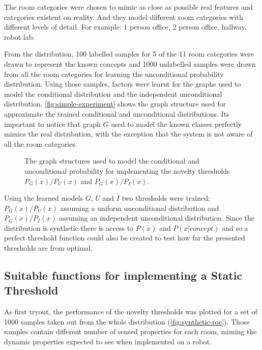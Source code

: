 \documentclass[runningheads,a4paper]{llncs}
\begin{document}
The room categories were chosen to mimic as close as possible real features and
categories existent on reality. And they model different room categories with
different levels of detail. For example: 1 person office, 2 person office, hallway,
robot lab.

From the distribution, 100 labelled samples for 5 of the 11 room categories were
drawn to represent the known concepts and 1000 unlabelled samples were drawn from
all the room categories for learning the unconditional probability distribution.
Using those samples, factors were learnt for the graphs used to model the
conditional distribution and the independent unconditional distribution.
\autoref{fig:simple-experiment} shows the graph structure used for approximate the
trained conditional and unconditional distributions.
Its important to notice that graph $G$ used to model the known classes perfectly
mimics the real distribution, with the exception that the system is not aware of
all the room categories.

\begin{figure}[h]
\centering

\qquad
{}
\qquad
{}

\caption{\label{fig:simple-experiment}The graph structures used to model the
         conditional and unconditional probability for implementing the novelty
         thresholds $P_G(x)/P_U(x)$ and $P_G(x)/P_I(x)$.}
\end{figure}

Using the learned models $G$, $U$ and $I$ two thresholds were trained:
$P_G(x)/P_U(x)$ assuming a uniform unconditional distribution
and $P_G(x)/P_I(x)$ assuming an independent unconditional distribution.
Since the distribution is synthetic there is access to $P(x)$ and $P(x|concept)$
and so a perfect threshold function could also be created to test how far the
presented thresholds are from optimal.

\subsection{Suitable functions for implementing a Static Threshold}
As first tryout, the performance of the novelty thresholds was plotted for a set
of 1000 samples taken out from the whole distribution (\autoref{fig:synthetic-roc}).
Those samples contain different number of sensed properties for each room, miming
the dynamic properties expected to see when implemented on a robot.
\end{document}
